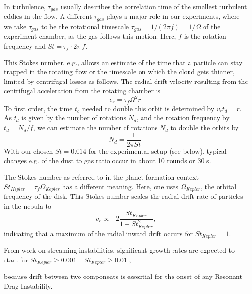 {In turbulence, $\tau_{gas}$ usually describes the correlation time of the smallest turbulent eddies in the flow.
A different $\tau_{gas}$ plays a major role in our experiments, where we take $\tau_{gas}$ to be the rotational timescale $\tau_{gas} = 1/(2\pi f) = 1/\Omega$ of the experiment chamber, as the gas follows this motion. Here, $f$ is the rotation frequency and $St = \tau_f \cdot 2\pi~f$. 

This Stokes number, e.g., allows an estimate of the time that a particle can stay trapped in the rotating flow or the timescale on which the cloud gets thinner, limited by centrifugal losses as follows.
The radial drift velocity resulting from the centrifugal acceleration from the rotating chamber is
\begin{equation}
v_r = \tau_f \Omega^2 r.
\end{equation}
To first order, the time $t_d$ needed to double this orbit is determined by $v_r t_d = r$. As $t_d$ is given by the number of rotations $N_d$, and the rotation frequency by $t_d = N_d / f$, we can estimate the number of rotations $N_d$ to double the orbits by \citep{klahr1997}
\begin{equation}
N_d = \frac{1}{2 \pi St}.
\end{equation}
With our chosen $St = 0.014$ for the experimental setup (see below), typical  changes e.g. of the dust to gas ratio occur in about 10 rounds or 30 s.

The Stokes number as referred to in the planet formation context $St_{Kepler} = \tau_f \Omega_{Kepler}$ has a different meaning. 
Here, one uses $\Omega_{Kepler}$, the orbital frequency of the disk.
This Stokes number scales the radial drift rate of particles in the nebula to \citep{Weidenschilling1977a}
\begin{equation}
v_r \propto - 2 \frac{St_{Kepler}}{1 + St^2_{Kepler}},
\end{equation}
indicating that a maximum of the radial inward drift occurs for $St_{Kepler} = 1$.

From work on streaming in\-sta\-bi\-li\-ties, significant \linebreak growth rates are ex\-pected to start for $St_{Kepler} \geq 0.001$ -- 
$St_{Kepler} \geq 0.01$ \citep{drkazkowska2014,bai2010,yang2017,Carrera2017},{ because drift {between two components} is essential for the onset of any Resonant Drag Instability.

}}

